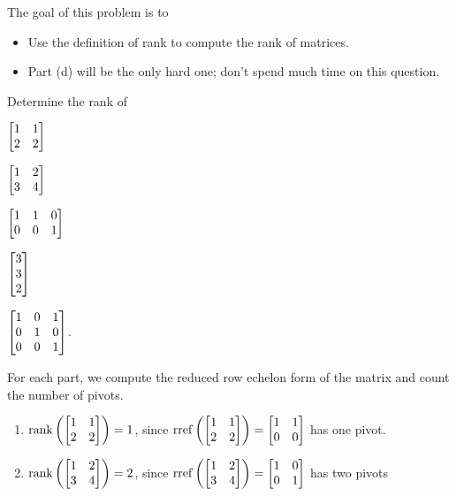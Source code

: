 \documentclass{workbook}
\newcommand{\bookonlynewpage}{\begin{bookonly}\newpage\end{bookonly}}
\begin{document}
\begin{slide}

	\bookonlynewpage
	\question
	\begin{annotation}
		\begin{goals}

			The goal of this problem is to
			\begin{itemize}
				\item Use the definition of rank  to compute the rank of matrices.
			\end{itemize}
		\end{goals}

		\begin{notes}
			\begin{itemize}
				\item Part (d) will be the only hard one; don't spend much time on this question.
			\end{itemize}
		\end{notes}
	\end{annotation}
	\begin{parts}
		\item Determine the rank of
		\begin{enumerate*}
			\item $\mat{1&1\\2&2}$
			\item $\mat{1&2\\3&4}$
			\item $\mat{1&1&0\\0&0&1}$
			\item $\mat{3\\3\\2}$
			\item $\mat{1&0&1\\0&1&0\\0&0&1}$.
		\end{enumerate*}
		\begin{solution}
			For each part, we compute the reduced row echelon form of the matrix
			and count the number of pivots.
			\begin{enumerate}
				\item $\Rank\left(\mat{1&1\\2&2}\right)=1$, since
					$\rref\left(\mat{1&1\\2&2}\right)=\mat{1&1\\0&0}$ has one pivot.
				\item $\Rank\left(\mat{1&2\\3&4}\right)=2$, since
					$\rref\left(\mat{1&2\\3&4}\right)=\mat{1&0\\0&1}$ has two pivots

\end{enumerate}
\end{solution}
\end{parts}
\end{slide}
\end{document}

